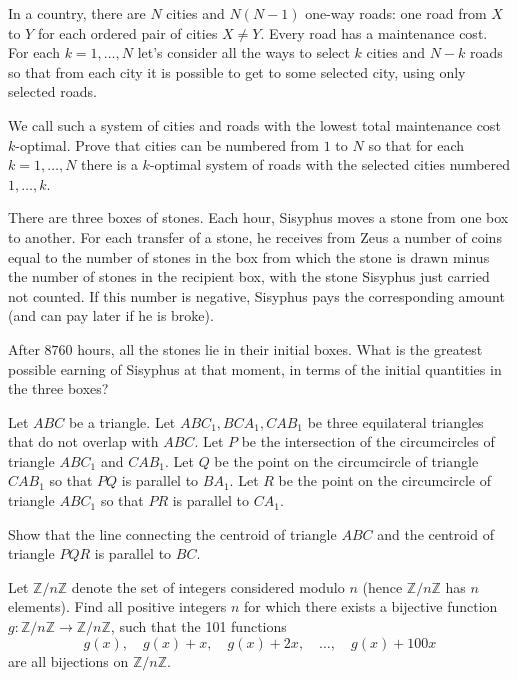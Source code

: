 \documentclass[11pt]{scrartcl}
\begin{document}
\begin{problem}[437956241529021]
	In a country, there are ${}N{}$ cities and $N(N-1)$ one-way roads: one road from $X{}$ to $Y{}$ for each ordered pair of cities $X \neq Y$. Every road has a maintenance cost. For each $k = 1,\ldots, N$ let's consider all the ways to select $k{}$ cities and $N - k{}$ roads so that from each city it is possible to get to some selected city, using only selected roads.

We call such a system of cities and roads with the lowest total maintenance cost $k{}$-optimal. Prove that cities can be numbered from $1{}$ to $N{}$ so that for each $k = 1,\ldots, N$ there is a $k{}$-optimal system of roads with the selected cities numbered $1,\ldots, k$.
\end{problem}
\begin{problem}[796313598765903]
  There are three boxes of stones.
  Each hour, Sisyphus moves a stone from one box to another.
  For each transfer of a stone, he receives from Zeus a number of coins
  equal to the number of stones in the box from which the stone is drawn
  minus the number of stones in the recipient box,
  with the stone Sisyphus just carried not counted.
  If this number is negative, Sisyphus pays the corresponding amount
  (and can pay later if he is broke).

  After $8760$ hours, all the stones lie in their initial boxes.
  What is the greatest possible earning of Sisyphus at that moment,
  in terms of the initial quantities in the three boxes?
\end{problem}
\begin{problem}[748616641641895]
Let $ABC$ be a triangle. Let $ABC_1, BCA_1, CAB_1$ be three equilateral triangles that do not overlap with $ABC$.
Let $P$ be the intersection of the circumcircles of triangle $ABC_1$ and $CAB_1$.
Let $Q$ be the point on the circumcircle of triangle $CAB_1$ so that $PQ$ is parallel to $BA_1$. Let $R$ be the point on the circumcircle of triangle $ABC_1$ so that $PR$ is parallel to $CA_1$.

Show that the line connecting the centroid of triangle $ABC$ and the centroid of triangle $PQR$ is parallel to $BC$.
\end{problem}
\begin{problem}[1856371892766039579]
Let $\mathbb{Z}/n\mathbb{Z}$ denote the set of integers considered modulo $n$ (hence $\mathbb{Z}/n\mathbb{Z}$ has $n$ elements). Find all positive integers $n$ for which there exists a bijective function $g: \mathbb{Z}/n\mathbb{Z} \to \mathbb{Z}/n\mathbb{Z}$, such that the 101 functions
\[g(x), \quad g(x) + x, \quad g(x) + 2x, \quad \dots, \quad g(x) + 100x\]are all bijections on $\mathbb{Z}/n\mathbb{Z}$.
\end{problem}
\end{document}

